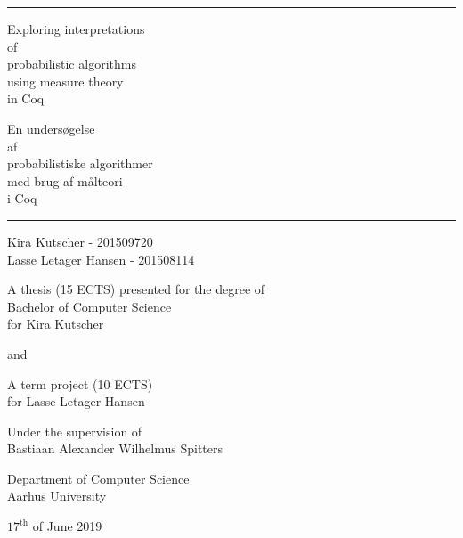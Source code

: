 \begin{titlepage}
  \hrule
  \vspace{0.8cm}
  \begin{minipage}{0.45\textwidth}
    \begin{center}
      \Large
      Exploring interpretations \\of\\ probabilistic algorithms\\
      using measure theory \\in Coq
    \end{center}
  \end{minipage}
  \begin{minipage}{0.5\textwidth}
    \begin{center}
      \Large
      En undersøgelse \\af\\
      probabilistiske algorithmer\\
      med brug af målteori\\
      i Coq
    \end{center}
  \end{minipage}
  \begin{center}

    \vspace{0.5cm}
    \hrule
    \vspace{0.5cm}

    \large
    Kira Kutscher - 201509720 \\
    Lasse Letager Hansen - 201508114

    \vfill

    A thesis (15 ECTS) presented for the degree of \\
    Bachelor of Computer Science \\
    for Kira Kutscher

    \vspace{0.5cm}

    and

    \vspace{0.5cm}
    
    A term project (10 ECTS)\\
    for Lasse Letager Hansen
    
    \vspace{1cm}

    Under the supervision of\\
    Bastiaan Alexander Wilhelmus Spitters

    \vspace{0.3cm}

    Department of Computer Science\\
    Aarhus University

    \vspace{0.3cm}
    
    $17^{\text{th}}$ of June 2019

  \end{center}
\end{titlepage}